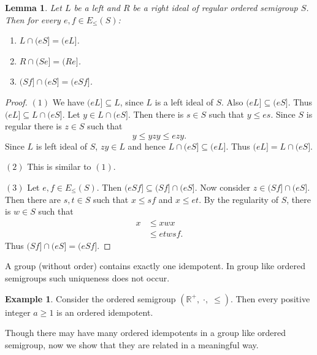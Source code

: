 \documentclass[13pt]{article}
\newtheorem{Lemma}[theorem]{Lemma}
\theoremstyle{definition}
\newtheorem{Example}[theorem]{Example}
\theoremstyle{remark}
\numberwithin{equation}{section}
\begin{document}
\begin{Lemma}\label{BI13}
Let $L$ be a left and $R$ be a right ideal of regular ordered
semigroup $S$. Then  for every $e, f \in E_\leq (S)$:

\begin{enumerate}
 \item \vspace{-.4cm}
$L \cap (eS] = (eL]$.
\item \vspace{-.4cm}
$R \cap (Se] = (Re]$.
\item \vspace{-.4cm}
$(Sf] \cap (eS] = (eSf]$.
\end{enumerate}
\end{Lemma}
\begin{proof}
$(1)$ We have $(eL] \subseteq L$, since $L$ is a left ideal of $S$.
Also $(eL] \subseteq (eS]$. Thus $(eL] \subseteq L \cap (eS]$. Let
$y \in L\cap(eS]$. Then there is $s \in S$ such that $y \leq es$.
Since $S$ is regular there is $z \in S$ such that $$y \leq yzy \leq
ezy.$$ Since $L$ is left ideal of $S$, $zy \in L$ and hence
$L\cap(eS] \subseteq (eL]$. Thus $(eL] = L \cap (eS]$.

$(2)$ This is similar to $(1)$.

$(3)$ Let $e, f \in E_\leq(S)$. Then $(eSf] \subseteq (Sf] \cap
(eS]$. Now  consider $z \in(Sf] \cap (eS]$. Then there are $s, t \in
S$ such that $x \leq sf$ and $x \leq et$. By the regularity of $S$,
there is $w \in S$ such that
\begin{align*}
x &\leq xwx\\
  & \leq etwsf.
\end{align*}
Thus $(Sf] \cap(eS] = (eSf]$.
\end{proof}





A group (without order) contains exactly one idempotent. In group
like ordered semigroups such uniqueness does not occur.

\begin{Example}
Consider the ordered semigroup $(\mathbb{R^+}, \;\cdot, \;\leq)$.
Then every positive integer $a \geq 1$ is an ordered idempotent.
\end{Example}


Though there may have many ordered idempotents in a group like
ordered semigroup, now we show that they are related in a meaningful
way.
\end{document}
